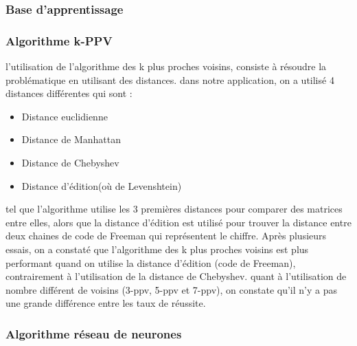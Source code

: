\documentclass[10pt,a4paper]{report}
\begin{document}
\subsubsection{Base d'apprentissage}

\subsubsection{Algorithme k-PPV}
l'utilisation de l'algorithme des k plus proches voisins, consiste à résoudre la problématique en utilisant des distances.
dans notre application, on a utilisé 4 distances différentes qui sont : 
\begin{itemize}[label=$-$,leftmargin=*,parsep=0cm,itemsep=0cm,topsep=0cm]
\item Distance euclidienne
\item Distance de Manhattan 
\item Distance de Chebyshev
\item Distance d'édition(où de Levenshtein)
\end{itemize}
tel que l'algorithme utilise les 3 premières distances pour comparer des matrices entre elles, alors que la distance d'édition est utilisé pour trouver la distance entre deux chaines de code de Freeman qui représentent le chiffre.
Après plusieurs essais, on a constaté que l'algorithme des k plus proches voisins est plus performant quand on utilise la distance d'édition (code de Freeman), contrairement à l'utilisation de la distance de Chebyshev.
quant à l'utilisation de nombre différent de voisins (3-ppv, 5-ppv et 7-ppv), on constate qu'il n'y a pas une grande différence entre les taux de réussite.

\subsubsection{Algorithme réseau de neurones}
\end{document}
